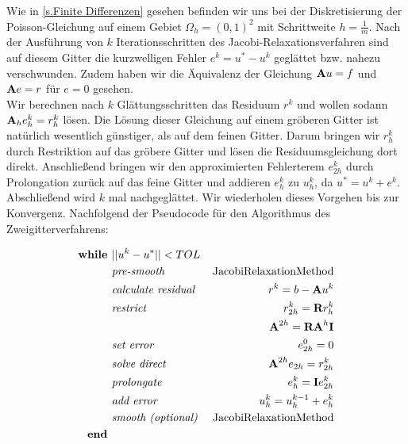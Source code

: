 Wie in \autoref{s.Finite Differenzen} gesehen befinden wir uns bei der Diskretisierung der Poisson-Gleichung auf einem Gebiet $\Omega_{h} = (0,1)^{2}$ mit Schrittweite $h = \frac {1} {m}$. Nach der Ausführung von $k$ Iterationsschritten des Jacobi-Relaxationsverfahren sind auf diesem Gitter die kurzwelligen Fehler $e^{k} = u^{*} - u^{k}$ geglättet bzw. nahezu verschwunden. Zudem haben wir die Äquivalenz der Gleichung ${\textbf{A}} u = f$ und ${\textbf{A}} e = r$ für $e = 0$ gesehen.\\
Wir berechnen nach $k$ Glättungsschritten das Residuum $r^{k}$ und wollen sodann ${\textbf{A}}_{h} e^{k}_{h} = r^{k}_{h}$ lösen. Die Lösung dieser Gleichung auf einem gröberen Gitter ist natürlich wesentlich günstiger, als auf dem feinen Gitter. Darum bringen wir $r^{k}_{h}$ durch Restriktion auf das gröbere Gitter und lösen die Residuumsgleichung dort direkt. Anschließend bringen wir den approximierten Fehlerterem $e_{2h}^{k}$ durch Prolongation zurück auf das feine Gitter und addieren $e_{h}^{k}$ zu $u_{h}^{k}$, da $u^{*} = u^{k} + e^{k}$. Abschließend wird $k$ mal nachgeglättet. Wir wiederholen dieses Vorgehen bis zur Konvergenz. Nachfolgend der Pseudocode für den Algorithmus des Zweigitterverfahrens:

\begin{eqnarray}
\textbf{while }                                 &||u^{k} - u^{*}|| < TOL \notag \\
&\textit{pre-smooth }                         &\textnormal{JacobiRelaxationMethod} \notag \\
&\textit{calculate residual }        &r^{k} = b - {\textbf{A}}u^{k} \notag \\
&\textit{restrict }                         &r^{k}_{2h}={\textbf{R}}r^{k}_{h} \notag \\
&                                                                &{\textbf{A}}^{2h} = {\textbf{R}}{\textbf{A}}^{h}{\textbf{I}} \notag \\
&\textit{set error }                        &e^{0}_{2h} = 0 \notag \\
&\textit{solve direct }                        &{\textbf{A}}^{2h} e_{2h} = r^{k}_{2h} \notag \\
&\textit{prolongate }                        &e^{k}_{h} = {\textbf{I}}e^{k}_{2h} \notag \\
&\textit{add error }                        &u^{k}_{h} = u^{k-1}_{h} + e^{k}_{h} \notag \\
&\textit{smooth (optional) }        &\textnormal{JacobiRelaxationMethod} \notag \\
\textbf{end } \notag
\end{eqnarray}

